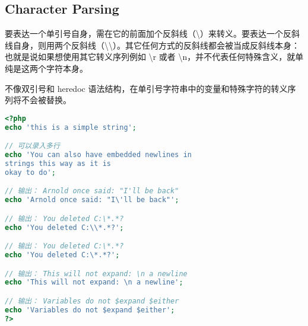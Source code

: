 \subsection{Character Parsing}



要表达一个单引号自身，需在它的前面加个反斜线（\textbackslash）来转义。要表达一个反斜线自身，则用两个反斜线（\textbackslash \textbackslash）。其它任何方式的反斜线都会被当成反斜线本身：也就是说如果想使用其它转义序列例如 \textbackslash r 或者 \textbackslash n，并不代表任何特殊含义，就单纯是这两个字符本身。



不像双引号和 heredoc 语法结构，在单引号字符串中的变量和特殊字符的转义序列将不会被替换。

\begin{lstlisting}[language=PHP]
<?php
echo 'this is a simple string';

// 可以录入多行
echo 'You can also have embedded newlines in 
strings this way as it is
okay to do';

// 输出： Arnold once said: "I'll be back"
echo 'Arnold once said: "I\'ll be back"';

// 输出： You deleted C:\*.*?
echo 'You deleted C:\\*.*?';

// 输出： You deleted C:\*.*?
echo 'You deleted C:\*.*?';

// 输出： This will not expand: \n a newline
echo 'This will not expand: \n a newline';

// 输出： Variables do not $expand $either
echo 'Variables do not $expand $either';
?>
\end{lstlisting}

